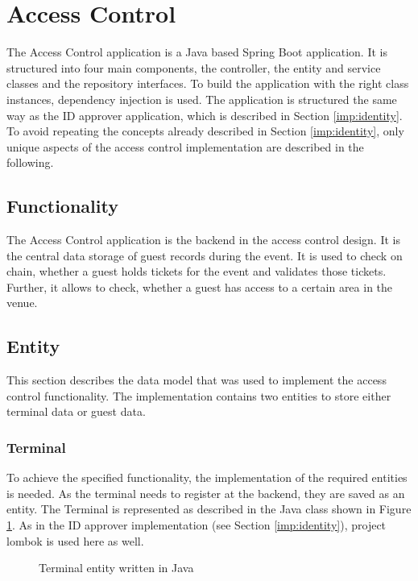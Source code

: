 \section{Access Control}
The Access Control application is a Java based Spring Boot application. It is structured into four main components, the controller, the entity and service classes and the repository interfaces. To build the application with the right class instances, dependency injection is used. The application is structured the same way as the ID approver application, which is described in Section \ref{imp:identity}. To avoid repeating the concepts already described in Section \ref{imp:identity}, only unique aspects of the access control implementation are described in the following.

\subsection{Functionality}
The Access Control application is the backend in the access control design. It is the central data storage of guest records during the event. It is used to check on chain, whether a guest holds tickets for the event and validates those tickets. Further, it allows to check, whether a guest has access to a certain area in the venue.

\subsection{Entity}
This section describes the data model that was used to implement the access control functionality. The implementation contains two entities to store either terminal data or guest data.

\subsubsection{Terminal}
To achieve the specified functionality, the implementation of the required entities is needed. As the terminal needs to register at the backend, they are saved as an entity. The Terminal is represented as described in the Java class shown in Figure \ref{code:entity:access}. As in the ID approver implementation (see Section \ref{imp:identity}), project lombok is used here as well.

\begin{figure}[H]
    
    \caption{Terminal entity written in Java}
    \label{code:entity:access}
\end{figure}


